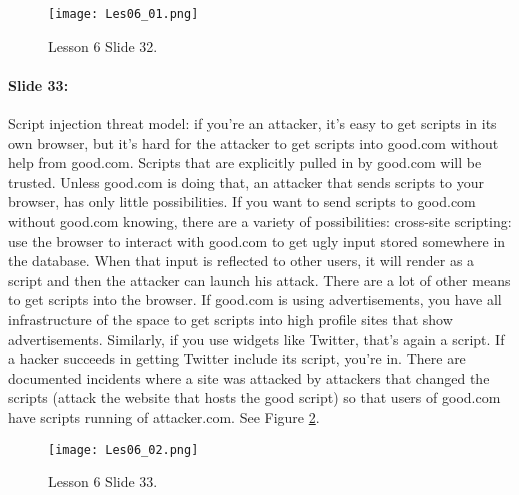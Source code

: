 \documentclass[10pt,a4paper]{report}
\begin{document}
\begin{figure}[ht!]
\centering
\texttt{[image: Les06\_01.png]}
\caption{Lesson 6 Slide 32.} 
\label{les06_01}
\end{figure}

\paragraph{Slide 33:} Script injection threat model: if you're an attacker, it's easy to get scripts in its own browser, but it's hard for the attacker to get scripts into good.com without help from good.com. Scripts that are explicitly pulled in by good.com will be trusted. Unless good.com is doing that, an attacker that sends scripts to your browser, has only little possibilities. If you want to send scripts to good.com without good.com knowing, there are a variety of possibilities: cross-site scripting: use the browser to interact with good.com to get ugly input stored somewhere in the database. When that input is reflected to other users, it will render as a script and then the attacker can launch his attack. There are a lot of other means to get scripts into the browser. If good.com is using advertisements, you have all infrastructure of the space to get scripts into high profile sites that show advertisements. Similarly, if you use widgets like Twitter, that's again a script. If a hacker succeeds in getting Twitter include its script, you're in.
There are documented incidents where a site was attacked by attackers that changed the scripts (attack the website that hosts the good script) so that users of good.com have scripts running of attacker.com. See Figure \ref{les06_02}.

\begin{figure}[ht!]
\centering
\texttt{[image: Les06\_02.png]}
\caption{Lesson 6 Slide 33.} 
\label{les06_02}
\end{figure}
\end{document}
